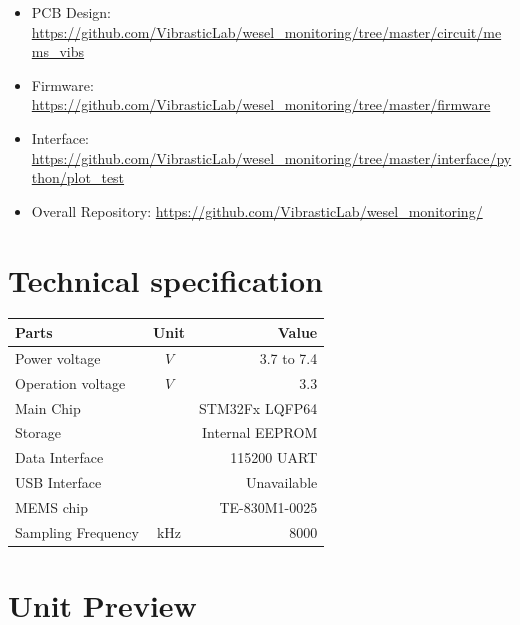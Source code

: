 \documentclass[a4paper,12pt,oneside,pdflatex,italian,final,twocolumn]{article}
\begin{document}
	\begin{itemize}
		\item PCB Design: \url{https://github.com/VibrasticLab/wesel_monitoring/tree/master/circuit/mems_vibs}

		\item Firmware: \url{https://github.com/VibrasticLab/wesel_monitoring/tree/master/firmware}

		\item Interface: \url{https://github.com/VibrasticLab/wesel_monitoring/tree/master/interface/python/plot_test}

		\item Overall Repository: \url{https://github.com/VibrasticLab/wesel_monitoring/}
	\end{itemize}

	\section{Technical specification}
	\centering
	\begin{tabular}{lcr}
		\toprule
		Parts & Unit & Value \\
		\midrule
		Power voltage & $V$ & 3.7 to 7.4 \\
		Operation voltage & $V$ & 3.3 \\
		Main Chip & & STM32Fx LQFP64 \\
		Storage & & Internal EEPROM \\
		Data Interface & & 115200 UART \\
		USB Interface & & Unavailable \\
		MEMS chip & & TE-830M1-0025 \\
		Sampling Frequency & kHz & 8000 \\
		\bottomrule
	\end{tabular}

	\raggedright

	\newpage
	\section{Unit Preview}
\end{document}
